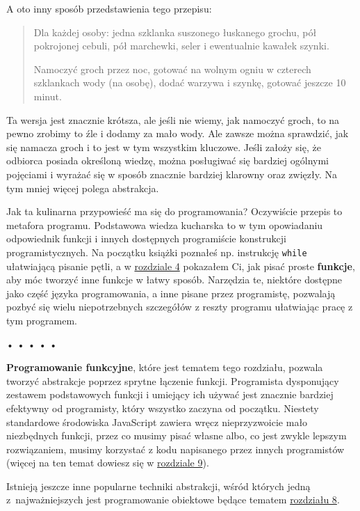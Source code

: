 A oto inny sposób przedstawienia tego przepisu:

  
\begin{quotation}
Dla każdej osoby: jedna szklanka suszonego łuskanego grochu, pół pokrojonej cebuli, pół marchewki, seler i ewentualnie kawałek szynki.
    
Namoczyć groch przez noc, gotować na wolnym ogniu w czterech szklankach wody (na osobę), dodać warzywa i szynkę, gotować jeszcze 10 minut.
\end{quotation}
  
Ta wersja jest znacznie krótsza, ale jeśli nie wiemy, jak namoczyć groch, to na pewno zrobimy to źle i dodamy za mało wody. Ale zawsze można sprawdzić, jak się namacza groch i to jest w tym wszystkim kluczowe. Jeśli założy się, że odbiorca posiada określoną wiedzę, można posługiwać się bardziej ogólnymi pojęciami i wyrażać się w sposób znacznie bardziej klarowny oraz zwięzły. Na tym mniej więcej polega abstrakcja.

  
Jak ta kulinarna przypowieść ma się do programowania? Oczywiście przepis to metafora programu. Podstawowa wiedza kucharska to w tym opowiadaniu odpowiednik funkcji i innych dostępnych programiście konstrukcji programistycznych. Na początku książki poznałeś np. instrukcję \texttt{while} ułatwiającą pisanie pętli, a w \hyperref[chap:4]{rozdziale 4} pokazałem Ci, jak pisać proste \textbf{funkcje}, aby móc tworzyć inne funkcje w łatwy sposób. Narzędzia te, niektóre dostępne jako część języka programowania, a inne pisane przez programistę, pozwalają pozbyć się wielu niepotrzebnych szczegółów z reszty programu ułatwiając pracę z tym programem.



\begin{center}
• • • • •
\end{center}

  
\textbf{Programowanie funkcyjne}, które jest tematem tego rozdziału, pozwala tworzyć abstrakcje poprzez sprytne łączenie funkcji. Programista dysponujący zestawem podstawowych funkcji i umiejący ich używać jest znacznie bardziej efektywny od programisty, który wszystko zaczyna od początku. Niestety standardowe środowiska JavaScript zawiera wręcz nieprzyzwoicie mało niezbędnych funkcji, przez co musimy pisać własne albo, co jest zwykle lepszym rozwiązaniem, musimy korzystać z kodu napisanego przez innych programistów (więcej na ten temat dowiesz się w \hyperref[chap:9]{rozdziale 9}).

  
Istnieją jeszcze inne popularne techniki abstrakcji, wśród których jedną z~najważniejszych jest programowanie obiektowe będące tematem \hyperref[chap:8]{rozdziału 8}.



